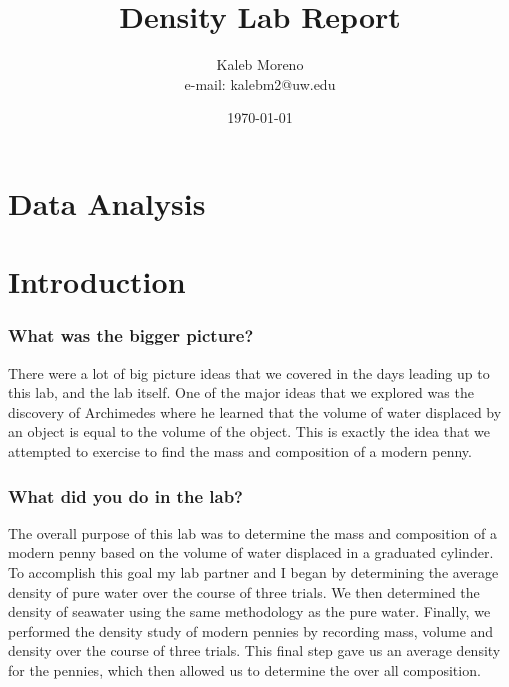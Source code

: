 \documentclass[a4paper,10pt]{article}
\begin{document}
  \title{Density Lab Report}

  \author{Kaleb Moreno \\ e-mail: kalebm2@uw.edu}

  \date{\today}

  \maketitle


  \newpage

  \tableofcontents

  \pagebreak
  \section*{Data Analysis}
  
  \section{Introduction}
    \subsubsection*{What was the bigger picture?}
      
      There were a lot of big picture ideas that we covered in the days leading up to this lab, and the lab itself. One of the major ideas that we explored was the discovery of Archimedes where he learned that the volume of water displaced by an object is equal to the volume of the object. This is exactly the idea that we attempted to exercise to find the mass and composition of a modern penny.
    
    \subsubsection*{What did you do in the lab?}

      The overall purpose of this lab was to determine the mass and composition of a modern penny based on the volume of water displaced in a graduated cylinder. To accomplish this goal my lab partner and I began by determining the average density of pure water over the course of three trials. We then determined the density of seawater using the same methodology as the pure water. Finally, we performed the density study of modern pennies by recording mass, volume and density over the course of three trials. This final step gave us an average density for the pennies, which then allowed us to determine the over all composition.  
\end{document}
